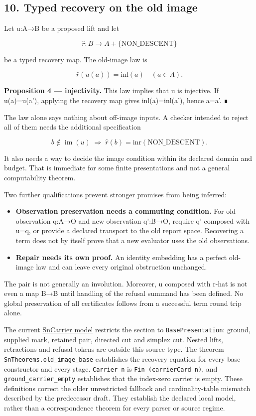 \documentclass[
  11pt,
]{article}
\providecommand{\tightlist}{%
  \setlength{\itemsep}{0pt}\setlength{\parskip}{0pt}}
\begin{document}
\subsection{10. Typed recovery on the old
image}\label{typed-recovery-on-the-old-image}

Let u:A→B be a proposed lift and let

\[
\widehat r:B\to A+\{\mathrm{NON\_DESCENT}\}
\]

be a typed recovery map. The old-image law is

\[
\widehat r(u(a))=\mathrm{inl}(a)\quad(a\in A).
\]

\textbf{Proposition 4 --- injectivity.} This law implies that u is
injective. If u(a)=u(a'), applying the recovery map gives
inl(a)=inl(a'), hence a=a'. ∎

The law alone says nothing about off-image inputs. A checker intended to
reject all of them needs the additional specification

\[
b\notin\operatorname{im}(u)\;\Longrightarrow\;
\widehat r(b)=\mathrm{inr}(\mathrm{NON\_DESCENT}).
\]

It also needs a way to decide the image condition within its declared
domain and budget. That is immediate for some finite presentations and
not a general computability theorem.

Two further qualifications prevent stronger promises from being
inferred:

\begin{itemize}
\tightlist
\item
  \textbf{Observation preservation needs a commuting condition.} For old
  observation q:A→O and new observation q':B→O, require q' composed with
  u=q, or provide a declared transport to the old report space.
  Recovering a term does not by itself prove that a new evaluator uses
  the old observations.
\item
  \textbf{Repair needs its own proof.} An identity embedding has a
  perfect old-image law and can leave every original obstruction
  unchanged.
\end{itemize}

The pair is not generally an involution. Moreover, u composed with r-hat
is not even a map B→B until handling of the refusal summand has been
defined. No global preservation of all certificates follows from a
successful term round trip alone.

The current \href{lean4/SnCarrier.lean}{SnCarrier model} restricts the
section to \nolinkurl{BasePresentation}: ground, supplied mark, retained
pair, directed cut and simplex cut. Nested lifts, retractions and
refusal tokens are outside this source type. The theorem
\nolinkurl{SnTheorems.old_image_base} establishes the recovery equation
for every base constructor and every stage. \texttt{Carrier\ n} is
\texttt{Fin\ (carrierCard\ n)}, and \nolinkurl{ground_carrier_empty}
establishes that the index-zero carrier is empty. These definitions
correct the older unrestricted fallback and cardinality-table mismatch
described by the predecessor draft. They establish the declared local
model, rather than a correspondence theorem for every parser or source
regime.
\end{document}
